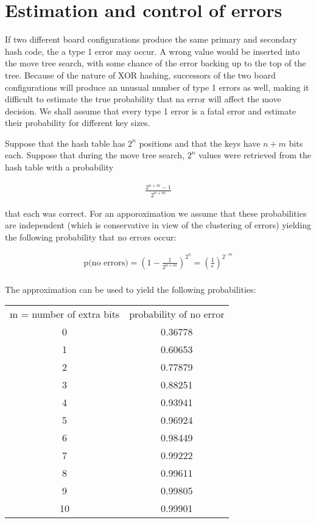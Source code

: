 \documentclass{article}
\begin{document}
\section*{Estimation and control of errors}

If two different board configurations produce the same primary and secondary
hash code, the a type 1 error may occur. A wrong value would be inserted into
the move tree search, with some chance of the error backing up to the top of
the tree. Because of the nature of XOR hashing, successors of the two board
configurations will produce an unusual number of type 1 errors as well, making
it difficult to estimate the true probability that na error will affect the
move decision. We shall assume that every type 1 error is a fatal error and
estimate their probability for different key sizes.

Suppose that the hash table has $2^n$ positions and that the keys have $n + m$
bits each. Suppose that during the move tree search, $2^n$ values were
retrieved from the hash table with a probability

\begin{align*}
\frac{2^{n + m} - 1}{2^{n+m}}
\end{align*}

that each was correct. For an apporoximation we assume that these probabilities
are independent (which is conservative in view of the clustering of errors)
yielding the following probability that no errors occur:

\begin{align*}
\text{p(no errors)} = (1 - \frac{1}{2^{n+m}})^{2^n} = (\frac{1}{e})^{2^{-m}} \\
\end{align*}

The approximation can be used to yield the following probabilities:

\begin{center}
\begin{tabular}{c c}
m = number of extra bits & probability of no error \\
0 & 0.36778 \\
1 & 0.60653 \\
2 & 0.77879 \\
3 & 0.88251 \\
4 & 0.93941 \\
5 & 0.96924 \\
6 & 0.98449 \\
7 & 0.99222 \\
8 & 0.99611 \\
9 & 0.99805 \\
10& 0.99901 \\
\end{tabular}
\end{center}
\end{document}
